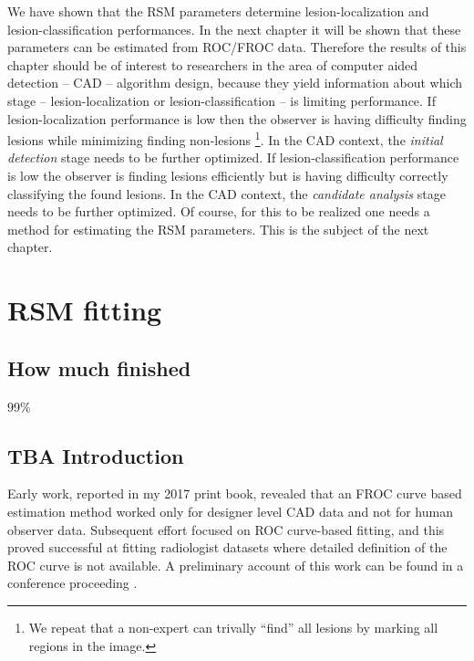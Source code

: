 \documentclass[
]{book}
\begin{document}
We have shown that the RSM parameters determine lesion-localization and lesion-classification performances. In the next chapter it will be shown that these parameters can be estimated from ROC/FROC data. Therefore the results of this chapter should be of interest to researchers in the area of computer aided detection -- CAD -- algorithm design, because they yield information about which stage -- lesion-localization or lesion-classification -- is limiting performance. If lesion-localization performance is low then the observer is having difficulty finding lesions while minimizing finding non-lesions \footnote{We repeat that a non-expert can trivally ``find'' all lesions by marking all regions in the image.}. In the CAD context, the \emph{initial detection} stage needs to be further optimized. If lesion-classification performance is low the observer is finding lesions efficiently but is having difficulty correctly classifying the found lesions. In the CAD context, the \emph{candidate analysis} stage needs to be further optimized. Of course, for this to be realized one needs a method for estimating the RSM parameters. This is the subject of the next chapter.

\hypertarget{rsm-fitting}{%
\chapter{RSM fitting}\label{rsm-fitting}}

\hypertarget{rsm-fitting-how-much-finished}{%
\section{How much finished}\label{rsm-fitting-how-much-finished}}

99\%

\hypertarget{rsm-fitting-intro}{%
\section{TBA Introduction}\label{rsm-fitting-intro}}

Early work, reported in my 2017 print book, revealed that an FROC curve based estimation method worked only for designer level CAD data and not for human observer data. Subsequent effort focused on ROC curve-based fitting, and this proved successful at fitting radiologist datasets where detailed definition of the ROC curve is not available. A preliminary account of this work can be found in a conference proceeding \citep{chakraborty2011estimating}.
\end{document}
